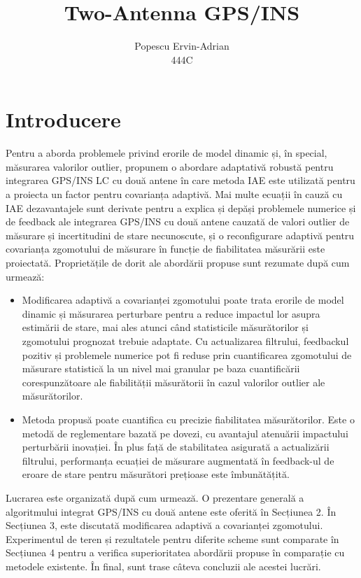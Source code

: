 \documentclass[10pt]{report}
\title{Two-Antenna GPS/INS }
\author{Popescu Ervin-Adrian\\444C}
\date{}
\begin{document}
\maketitle
\section*{Introducere}
Pentru a aborda problemele privind erorile de model dinamic și, în special, măsurarea
valorilor outlier, propunem o abordare adaptativă robustă pentru integrarea GPS/INS LC cu două antene în care metoda IAE este utilizată pentru a proiecta un factor pentru covarianța adaptivă. Mai multe ecuații în cauză cu IAE dezavantajele sunt derivate pentru a explica și depăși problemele numerice și de feedback ale
integrarea GPS/INS cu două antene cauzată de valori outlier de măsurare și incertitudini de stare necunoscute,
și o reconfigurare adaptivă pentru covarianța zgomotului de măsurare în funcție de fiabilitatea măsurării  este proiectată. Proprietățile de dorit ale abordării propuse sunt rezumate după cum urmează:
\begin{itemize}
  \item Modificarea adaptivă a covarianței zgomotului poate trata erorile de model dinamic și măsurarea
        perturbare pentru a reduce impactul lor asupra estimării de stare, mai ales atunci când statisticile măsurătorilor și zgomotului prognozat trebuie adaptate. Cu actualizarea filtrului, feedbackul pozitiv și problemele numerice pot fi reduse prin cuantificarea zgomotului de măsurare statistică la un nivel mai granular pe baza cuantificării corespunzătoare ale fiabilității măsurătorii în cazul valorilor outlier ale măsurătorilor.
  \item Metoda propusă poate cuantifica cu precizie fiabilitatea măsurătorilor. Este o metodă de reglementare bazată pe dovezi, cu avantajul atenuării impactului perturbării inovației. În plus față de
        stabilitatea asigurată a actualizării filtrului, performanța ecuației de măsurare augmentată în feedback-ul de eroare de stare pentru măsurători prețioase este îmbunătățită.
\end{itemize}

Lucrarea este organizată după cum urmează. O prezentare generală a algoritmului integrat GPS/INS cu două antene este oferită în Secțiunea 2. În Secțiunea 3, este discutată modificarea adaptivă a covarianței zgomotului. Experimentul de teren și rezultatele pentru diferite scheme sunt comparate în Secțiunea 4 pentru a verifica superioritatea abordării propuse în comparație cu metodele existente. În final, sunt trase câteva concluzii ale acestei lucrări.
\end{document}
